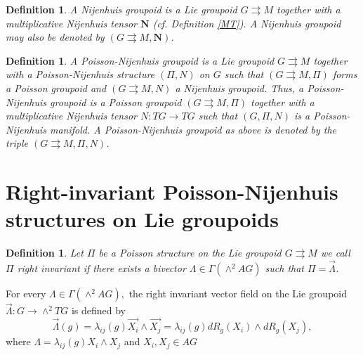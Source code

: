 \documentclass{article}
\newtheorem{definition}[theorem]{Definition}
\begin{document}
\begin{definition}\label{NG}
A Nijenhuis groupoid is a Lie groupoid $G\rightrightarrows M$ together with a multiplicative Nijenhuis tensor $\mathbf{N}$ (cf. Definition \ref{MT}). A Nijenhuis groupoid may also be denoted by $(G\rightrightarrows M,\mathbf{N})$.

\end{definition}

\begin{definition}\label{PNG}
A Poisson-Nijenhuis groupoid is a Lie groupoid $G\rightrightarrows M$ together with a Poisson-Nijenhuis structure $(\Pi,N)$ on $G$ such that $(G\rightrightarrows M,\Pi)$ forms a Poisson groupoid and $(G\rightrightarrows M,N)$ a Nijenhuis groupoid. Thus, a Poisson-Nijenhuis groupoid is a Poisson groupoid $(G\rightrightarrows M,\Pi)$ together with a multiplicative Nijenhuis tensor $N:TG \to TG$ such that $(G,\Pi,N)$ is a Poisson-Nijenhuis manifold. A Poisson-Nijenhuis groupoid as above is denoted by the triple $(G\rightrightarrows M,\Pi,N)$.
\end{definition}

\section{Right-invariant Poisson-Nijenhuis structures on Lie groupoids}

\begin{definition}\label{RIPS}
Let $\Pi$ be a Poisson structure on the Lie groupoid $G\rightrightarrows M$ we call $\Pi$ right invariant if there exists a bivector 
$\Lambda \in \Gamma(\wedge^2 AG)$ such that  $\Pi=\overrightarrow{\Lambda}$. 
\end{definition}
For every $\Lambda \in \Gamma(\wedge^2 AG),$ the right invariant vector field on the Lie groupoid
 $\overrightarrow{\Lambda} : G\to \wedge^2 TG$ is defined by 
 \begin{equation}
 \overrightarrow{\Lambda}(g)=\lambda_{ij}(g)\overrightarrow{X_i}\wedge \overrightarrow{X_j}=\lambda_{ij}(g)dR_g(X_i)\wedge dR_g(X_j),
 \end{equation} 
where $\Lambda= \lambda_{ij}(g)X_i\wedge X_j$ and $X_i, X_j \in AG$ 
\end{document}
